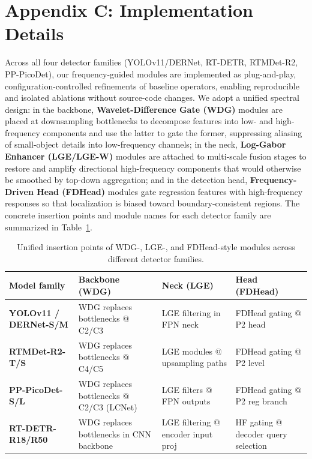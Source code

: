 \documentclass{article}
\theoremstyle{plain}
\theoremstyle{definition}
\theoremstyle{remark}
\begin{document}
\section{Appendix C: Implementation Details}
\label{sec:appendix_c_implementation_details}

Across all four detector families (YOLOv11/DERNet, RT-DETR, RTMDet-R2, PP-PicoDet), our frequency-guided modules are implemented as plug-and-play, configuration-controlled refinements of baseline operators, enabling reproducible and isolated ablations without source-code changes. We adopt a unified spectral design: in the backbone, \textbf{Wavelet-Difference Gate (WDG)} modules are placed at downsampling bottlenecks to decompose features into low- and high-frequency components and use the latter to gate the former, suppressing aliasing of small-object details into low-frequency channels; in the neck, \textbf{Log-Gabor Enhancer (LGE/LGE-W)} modules are attached to multi-scale fusion stages to restore and amplify directional high-frequency components that would otherwise be smoothed by top-down aggregation; and in the detection head, \textbf{Frequency-Driven Head (FDHead)} modules gate regression features with high-frequency responses so that localization is biased toward boundary-consistent regions. The concrete insertion points and module names for each detector family are summarized in Table~\ref{tab:unified_insertion_points}.

\begin{table}[h]
\centering
\caption{Unified insertion points of WDG-, LGE-, and FDHead-style modules across different detector families.}
\label{tab:unified_insertion_points}
\vspace{0.1cm}
\fontsize{7pt}{8pt}\selectfont
\setlength{\tabcolsep}{3pt}
\renewcommand{\arraystretch}{1.05}
\begin{tabular}{@{}p{}p{}p{}p{}@{}}
\toprule
\cellcolor{blue!5}\textbf{Model family} & \cellcolor{blue!5}\textbf{Backbone (WDG)} & \cellcolor{blue!5}\textbf{Neck (LGE)} & \cellcolor{blue!5}\textbf{Head (FDHead)} \\
\midrule
\textbf{YOLOv11 / DERNet-S/M} & WDG replaces bottlenecks @ C2/C3 & LGE filtering in FPN neck & FDHead gating @ P2 head \\
\textbf{RTMDet-R2-T/S} & WDG replaces bottlenecks @ C4/C5 & LGE modules @ upsampling paths & FDHead gating @ P2 level \\
\textbf{PP-PicoDet-S/L} & WDG replaces bottlenecks @ C2/C3 (LCNet) & LGE filters @ FPN outputs & FDHead gating @ P2 reg branch \\
\textbf{RT-DETR-R18/R50} & WDG replaces bottlenecks in CNN backbone & LGE filtering @ encoder input proj & HF gating @ decoder query selection \\
\bottomrule
\end{tabular}
\end{table}
\end{document}
